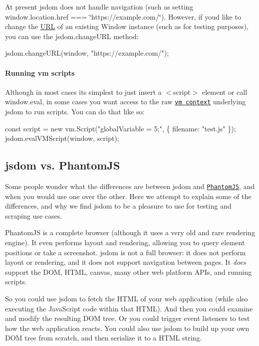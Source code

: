At present jsdom does not handle navigation (such as setting {\ttfamily window.\+location.\+href === \char`\"{}https\+://example.\+com/\char`\"{}}). However, if you\textquotesingle{}d like to change the \mbox{\hyperlink{namespace_u_r_l}{U\+RL}} of an existing {\ttfamily Window} instance (such as for testing purposes), you can use the {\ttfamily jsdom.\+change\+U\+RL} method\+:


\begin{DoxyCode}
jsdom.changeURL(window, "https://example.com/");
\end{DoxyCode}


\paragraph*{Running vm scripts}

Although in most cases it\textquotesingle{}s simplest to just insert a {\ttfamily $<$script$>$} element or call {\ttfamily window.\+eval}, in some cases you want access to the raw \href{https://nodejs.org/api/vm.html}{\tt vm context} underlying jsdom to run scripts. You can do that like so\+:


\begin{DoxyCode}
const script = new vm.Script("globalVariable = 5;", \{ filename: "test.js" \});
jsdom.evalVMScript(window, script);
\end{DoxyCode}


\subsection*{jsdom vs. Phantom\+JS}

Some people wonder what the differences are between jsdom and \href{http://phantomjs.org/}{\tt Phantom\+JS}, and when you would use one over the other. Here we attempt to explain some of the differences, and why we find jsdom to be a pleasure to use for testing and scraping use cases.

Phantom\+JS is a complete browser (although it uses a very old and rare rendering engine). It even performs layout and rendering, allowing you to query element positions or take a screenshot. jsdom is not a full browser\+: it does not perform layout or rendering, and it does not support navigation between pages. It {\itshape does} support the D\+OM, H\+T\+ML, canvas, many other web platform A\+P\+Is, and running scripts.

So you could use jsdom to fetch the H\+T\+ML of your web application (while also executing the Java\+Script code within that H\+T\+ML). And then you could examine and modify the resulting D\+OM tree. Or you could trigger event listeners to test how the web application reacts. You could also use jsdom to build up your own D\+OM tree from scratch, and then serialize it to a H\+T\+ML string.

